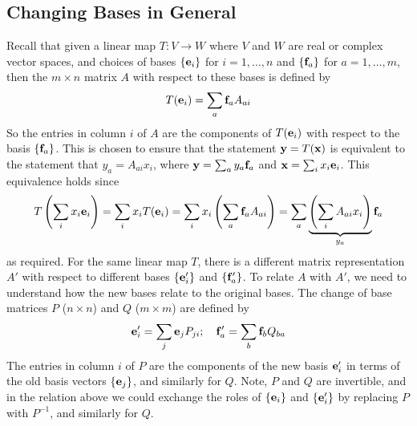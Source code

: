 \subsection{Changing Bases in General}
Recall that given a linear map \(T\colon V \to W\) where \(V\) and \(W\) are real or complex vector spaces, and choices of bases \(\{ \vb e_i \}\) for \(i = 1, \dots, n\) and \(\{\vb f_a \}\) for \(a = 1, \dots, m\), then the \(m \times n\) matrix \(A\) with respect to these bases is defined by
\[
	T(\vb e_i) = \sum_a \vb f_a A_{ai}
\]
So the entries in column \(i\) of \(A\) are the components of \(T(\vb e_i)\) with respect to the basis \(\{ \vb f_a \}\).
This is chosen to ensure that the statement \(\vb y = T(\vb x)\) is equivalent to the statement that \(y_a = A_{ai}x_i\), where \(\vb y = \sum_a y_a \vb f_a\) and \(\vb x = \sum_i x_i \vb e_i\).
This equivalence holds since
\[
	T\left(\sum_i x_i \vb e_i \right) = \sum_i x_i T(\vb e_i) = \sum_i x_i \left( \sum_a \vb f_a A_{ai} \right) = \sum_a \underbrace{\left( \sum_i A_{ai} x_i \right)}_{y_a} \vb f_a
\]
as required.
For the same linear map \(T\), there is a different matrix representation \(A'\) with respect to different bases \(\{ \vb e'_i \}\) and \(\{ \vb f'_a \}\).
To relate \(A\) with \(A'\), we need to understand how the new bases relate to the original bases.
The change of base matrices \(P\) (\(n \times n\)) and \(Q\) (\(m \times m\)) are defined by
\[
	\vb e_i' = \sum_j \vb e_j P_{ji};\quad \vb f_a' = \sum_b \vb f_b Q_{ba}
\]
The entries in column \(i\) of \(P\) are the components of the new basis \(\vb e_i'\) in terms of the old basis vectors \(\{ \vb e_j \}\), and similarly for \(Q\).
Note, \(P\) and \(Q\) are invertible, and in the relation above we could exchange the roles of \(\{ \vb e_i \}\) and \(\{ \vb e'_i \}\) by replacing \(P\) with \(P^{-1}\), and similarly for \(Q\).

